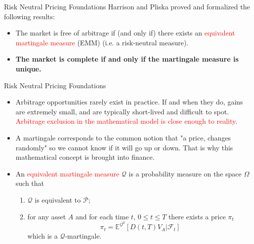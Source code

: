 \documentclass{beamer}
\begin{document}
	\begin{frame}{Risk Neutral Pricing Foundations}
	Harrison and Pliska proved and formalized the following results:
	\begin{itemize}
		\item The market is free of arbitrage if (and only if) there exists an \textcolor{red}{equivalent martingale measure} (EMM) (i.e. a risk-neutral measure).
		\item \textbf{The market is complete if and only if the martingale measure is unique.}
	\end{itemize}
	\vfill
\end{frame}



\begin{frame}{Risk Neutral Pricing Foundations}
\begin{itemize}
	\item Arbitrage opportunities rarely exist in practice. If and when they do, gains are extremely small, and are typically short-lived and difficult to spot. \textcolor{red}{Arbitrage exclusion in the mathematical model is close enough to reality}.
	\item A martingale corresponds to the common notion that "a price, changes randomly" so we cannot know if it will go up or down. That is why this mathematical concept is brought into finance.
	\item An \textcolor{red}{equivalent martingale measure} $\mathcal{Q}$ is a probability measure on the space $\Omega$ such that
	\begin{enumerate}
		\item $\mathcal{Q}$ is equivalent to $\mathcal{P}$;
		\item for any asset $A$ and for each time $t$, $0\le t\le T$ there exists a price $\pi_t$
		\begin{equation*}
			\pi_t = \mathbb{E}^{\mathcal{Q}^0}[D(t,T)V_A|\mathcal{F}_t]
		\end{equation*}
		which is a $\mathcal{Q}$-martingale.
	\end{enumerate}
\end{itemize}
\end{frame}
\end{document}
